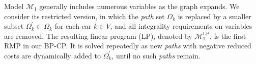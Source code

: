 \documentclass[12pt]{article}
\begin{document}




Model $\mathcal{M}_1$ generally includes numerous variables as the graph expands. We consider its restricted version, in which the \textit{path} set $\Omega_k$ is replaced by a smaller subset $\Omega^{\prime}_k\subset \Omega_k$ for each car $k\in V$, and all integrality requirements on variables are removed. The resulting linear program (LP), denoted by $\mathcal{M}^{\text{LP}}_1$, is the first RMP in our BP-CP. It is solved repeatedly as new \textit{paths} with negative reduced costs are dynamically added to $\Omega^{\prime}_k$, until no such \textit{paths} remain.
\end{document}

